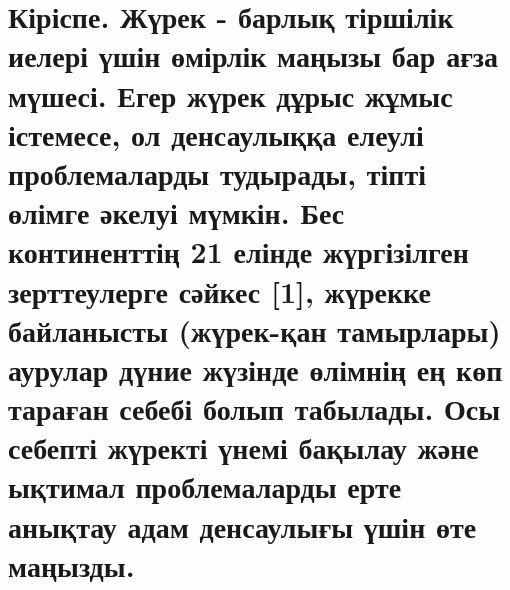 \documentclass[
]{article}
\begin{document}
\section{\texorpdfstring{\textbf{Кіріспе}. Жүрек - барлық тіршілік
иелері үшін өмірлік маңызы бар ағза мүшесі. Егер жүрек дұрыс жұмыс
істемесе, ол денсаулыққа елеулі проблемаларды тудырады, тіпті өлімге
әкелуі мүмкін. Бес континенттің 21 елінде жүргізілген зерттеулерге
сәйкес {[}1{]}, жүрекке байланысты (жүрек-қан тамырлары) аурулар дүние
жүзінде өлімнің ең көп тараған себебі болып табылады. Осы себепті
жүректі үнемі бақылау және ықтимал проблемаларды ерте анықтау адам
денсаулығы үшін өте маңызды.
}{Кіріспе. Жүрек - барлық тіршілік иелері үшін өмірлік маңызы бар ағза мүшесі. Егер жүрек дұрыс жұмыс істемесе, ол денсаулыққа елеулі проблемаларды тудырады, тіпті өлімге әкелуі мүмкін. Бес континенттің 21 елінде жүргізілген зерттеулерге сәйкес {[}1{]}, жүрекке байланысты (жүрек-қан тамырлары) аурулар дүние жүзінде өлімнің ең көп тараған себебі болып табылады. Осы себепті жүректі үнемі бақылау және ықтимал проблемаларды ерте анықтау адам денсаулығы үшін өте маңызды. }}\label{ux43aux456ux440ux456ux441ux43fux435.-ux436ux4afux440ux435ux43a---ux431ux430ux440ux43bux44bux49b-ux442ux456ux440ux448ux456ux43bux456ux43a-ux438ux435ux43bux435ux440ux456-ux4afux448ux456ux43d-ux4e9ux43cux456ux440ux43bux456ux43a-ux43cux430ux4a3ux44bux437ux44b-ux431ux430ux440-ux430ux493ux437ux430-ux43cux4afux448ux435ux441ux456.-ux435ux433ux435ux440-ux436ux4afux440ux435ux43a-ux434ux4b1ux440ux44bux441-ux436ux4b1ux43cux44bux441-ux456ux441ux442ux435ux43cux435ux441ux435-ux43eux43b-ux434ux435ux43dux441ux430ux443ux43bux44bux49bux49bux430-ux435ux43bux435ux443ux43bux456-ux43fux440ux43eux431ux43bux435ux43cux430ux43bux430ux440ux434ux44b-ux442ux443ux434ux44bux440ux430ux434ux44b-ux442ux456ux43fux442ux456-ux4e9ux43bux456ux43cux433ux435-ux4d9ux43aux435ux43bux443ux456-ux43cux4afux43cux43aux456ux43d.-ux431ux435ux441-ux43aux43eux43dux442ux438ux43dux435ux43dux442ux442ux456ux4a3-21-ux435ux43bux456ux43dux434ux435-ux436ux4afux440ux433ux456ux437ux456ux43bux433ux435ux43d-ux437ux435ux440ux442ux442ux435ux443ux43bux435ux440ux433ux435-ux441ux4d9ux439ux43aux435ux441-1-ux436ux4afux440ux435ux43aux43aux435-ux431ux430ux439ux43bux430ux43dux44bux441ux442ux44b-ux436ux4afux440ux435ux43a-ux49bux430ux43d-ux442ux430ux43cux44bux440ux43bux430ux440ux44b-ux430ux443ux440ux443ux43bux430ux440-ux434ux4afux43dux438ux435-ux436ux4afux437ux456ux43dux434ux435-ux4e9ux43bux456ux43cux43dux456ux4a3-ux435ux4a3-ux43aux4e9ux43f-ux442ux430ux440ux430ux493ux430ux43d-ux441ux435ux431ux435ux431ux456-ux431ux43eux43bux44bux43f-ux442ux430ux431ux44bux43bux430ux434ux44b.-ux43eux441ux44b-ux441ux435ux431ux435ux43fux442ux456-ux436ux4afux440ux435ux43aux442ux456-ux4afux43dux435ux43cux456-ux431ux430ux49bux44bux43bux430ux443-ux436ux4d9ux43dux435-ux44bux49bux442ux438ux43cux430ux43b-ux43fux440ux43eux431ux43bux435ux43cux430ux43bux430ux440ux434ux44b-ux435ux440ux442ux435-ux430ux43dux44bux49bux442ux430ux443-ux430ux434ux430ux43c-ux434ux435ux43dux441ux430ux443ux43bux44bux493ux44b-ux4afux448ux456ux43d-ux4e9ux442ux435-ux43cux430ux4a3ux44bux437ux434ux44b.}
\end{document}
